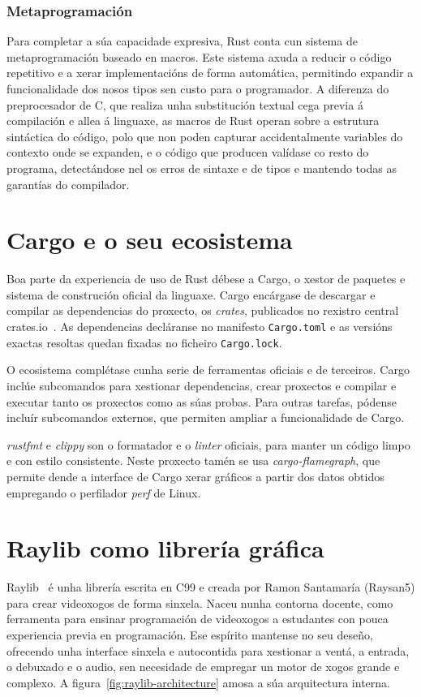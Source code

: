\subsubsection{Metaprogramación}
Para completar a súa capacidade expresiva, Rust conta cun sistema de metaprogramación baseado en macros.
Este sistema axuda a reducir o código repetitivo e a xerar implementacións de forma automática,
permitindo expandir a funcionalidade dos nosos tipos sen custo para o programador.
A diferenza do preprocesador de C, que realiza unha substitución textual cega
previa á compilación e allea á linguaxe,
as macros de Rust operan sobre a estrutura sintáctica do código,
polo que non poden capturar accidentalmente variables do contexto onde se expanden,
e o código que producen valídase co resto do programa,
detectándose nel os erros de sintaxe e de tipos e mantendo todas as garantías do compilador.


\section{Cargo e o seu ecosistema}
Boa parte da experiencia de uso de Rust débese a Cargo,
o xestor de paquetes e sistema de construción oficial da linguaxe.
Cargo encárgase de descargar e compilar as dependencias do proxecto,
os \textit{crates}, publicados no rexistro central crates.io~\cite{CratesIo}.
As dependencias decláranse no manifesto \texttt{Cargo.toml}
e as versións exactas resoltas quedan fixadas no ficheiro \texttt{Cargo.lock}.

O ecosistema complétase cunha serie de ferramentas oficiais e de terceiros.
Cargo inclúe subcomandos para xestionar dependencias, crear proxectos e compilar e executar tanto os proxectos como as súas probas.
Para outras tarefas, pódense incluír subcomandos externos, que permiten ampliar a funcionalidade de Cargo.

\textit{rustfmt} e \textit{clippy} son o formatador e o \textit{linter} oficiais, para manter un código limpo e con estilo consistente.
Neste proxecto tamén se usa \textit{cargo-flamegraph}, que permite dende a interface de Cargo xerar gráficos
a partir dos datos obtidos empregando o perfilador \textit{perf} de Linux.

\section{Raylib como librería gráfica}
Raylib~\cite{Raylib}
é unha librería escrita en C99 e creada por Ramon Santamaría (Raysan5) para crear videoxogos de forma sinxela.
Naceu nunha contorna docente, como ferramenta para ensinar programación de videoxogos
a estudantes con pouca experiencia previa en programación.
Ese espírito mantense no seu deseño, ofrecendo unha interface sinxela e autocontida para xestionar a ventá, a entrada,
o debuxado e o audio, sen necesidade de empregar un motor de xogos grande e complexo.
A figura~\ref{fig:raylib-architecture} amosa a súa arquitectura interna.

